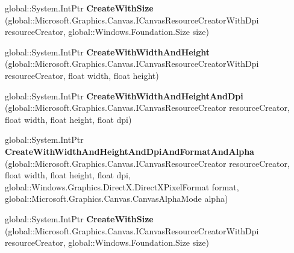 \begin{DoxyCompactItemize}
\item 
\mbox{\label{interface_microsoft_1_1_graphics_1_1_canvas_1_1_i_canvas_render_target_factory_ac73767c2259e7be23e5908d0eb7862f9}} 
global\+::\+System.\+Int\+Ptr {\bfseries Create\+With\+Size} (global\+::\+Microsoft.\+Graphics.\+Canvas.\+I\+Canvas\+Resource\+Creator\+With\+Dpi resource\+Creator, global\+::\+Windows.\+Foundation.\+Size size)
\item 
\mbox{\label{interface_microsoft_1_1_graphics_1_1_canvas_1_1_i_canvas_render_target_factory_afd51138794b4d13559098c29d90fa247}} 
global\+::\+System.\+Int\+Ptr {\bfseries Create\+With\+Width\+And\+Height} (global\+::\+Microsoft.\+Graphics.\+Canvas.\+I\+Canvas\+Resource\+Creator\+With\+Dpi resource\+Creator, float width, float height)
\item 
\mbox{\label{interface_microsoft_1_1_graphics_1_1_canvas_1_1_i_canvas_render_target_factory_a4955cd48960b91634ca9ebaf71914d35}} 
global\+::\+System.\+Int\+Ptr {\bfseries Create\+With\+Width\+And\+Height\+And\+Dpi} (global\+::\+Microsoft.\+Graphics.\+Canvas.\+I\+Canvas\+Resource\+Creator resource\+Creator, float width, float height, float dpi)
\item 
\mbox{\label{interface_microsoft_1_1_graphics_1_1_canvas_1_1_i_canvas_render_target_factory_a25958fedb26248394e6b8cfbc8e3de9f}} 
global\+::\+System.\+Int\+Ptr {\bfseries Create\+With\+Width\+And\+Height\+And\+Dpi\+And\+Format\+And\+Alpha} (global\+::\+Microsoft.\+Graphics.\+Canvas.\+I\+Canvas\+Resource\+Creator resource\+Creator, float width, float height, float dpi, global\+::\+Windows.\+Graphics.\+Direct\+X.\+Direct\+X\+Pixel\+Format format, global\+::\+Microsoft.\+Graphics.\+Canvas.\+Canvas\+Alpha\+Mode alpha)
\item 
\mbox{\label{interface_microsoft_1_1_graphics_1_1_canvas_1_1_i_canvas_render_target_factory_ac73767c2259e7be23e5908d0eb7862f9}} 
global\+::\+System.\+Int\+Ptr {\bfseries Create\+With\+Size} (global\+::\+Microsoft.\+Graphics.\+Canvas.\+I\+Canvas\+Resource\+Creator\+With\+Dpi resource\+Creator, global\+::\+Windows.\+Foundation.\+Size size)

\end{DoxyCompactItemize}
